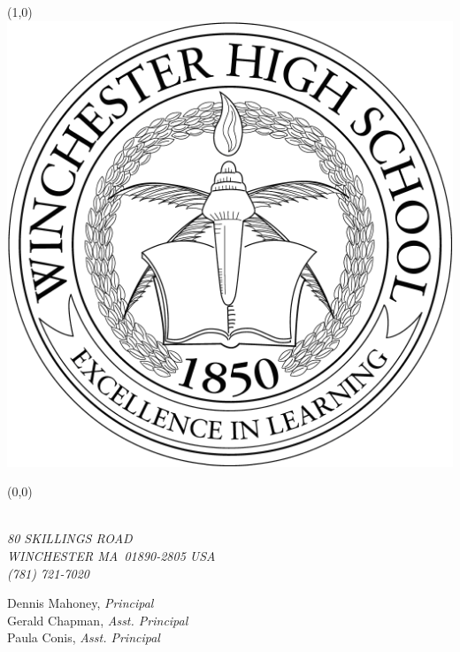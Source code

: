 \documentclass[11pt]{article}%
\def\docschooladdress{80 Skillings Road} %
\def\docschoolcitystate{Winchester MA} %
\def\docschoolzip{01890-2805 USA} %
\def\docschoolphone{(781) 721-7020} %
\begin{document}
\thispagestyle{first}

\setlength{\TPHorizModule}{.25in}
\setlength{\TPVertModule}{\TPHorizModule}
\textblockorigin{0.25in}{0.25in} %
\setlength{\parindent}{0pt}
\begin{textblock}{32}(1,0)
 \includegraphics*[scale = 0.125]{../images/whs-logo-1024x1024.png}
\end{textblock}
\begin{textblock}{32}(0,0)
 \begin{minipage}{\linewidth}\centering\em
  \LARGE\textsc{\docschool} \\
  \Large\MakeUppercase{\docschooladdress} \\
  \Large\MakeUppercase{\docschoolcitystate\ \docschoolzip} \\
  \Large\MakeUppercase{\docschoolphone}
 \end{minipage}
\end{textblock}

\vspace*{12.7mm} %
\begin{spacing}{1.2}\scriptsize
Dennis Mahoney, {\em Principal} \\
Gerald Chapman, {\em Asst. Principal} \\
Paula Conis, {\em Asst. Principal}
\end{spacing}
\end{document}
